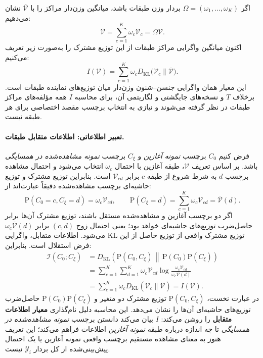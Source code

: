 اگر $\Omega=(\omega_1,\ldots,\omega_K)$ بردار وزن طبقات باشد، میانگین وزن‌دار مراکز را با $\overline{\mathcal V}$ نشان می‌دهیم:
\begin{equation}\label{cmp:eq:ch3-global-center}
\overline{\mathcal V}
=\sum_{c=1}^{K}\omega_c\mathcal V_c
=\Omega\mathcal V.
\end{equation}
اکنون میانگین واگرایی مراکز طبقات از این توزیع مشترک را به‌صورت زیر تعریف می‌کنیم:
\begin{equation}\label{cmp:eq:ch3-I-on-V}
\boxed{I(\mathcal V)=
\sum_{c=1}^{K}\omega_c
D_{\mathrm{KL}}\bigl(\mathcal V_c\|\overline{\mathcal V}\bigr).}
\end{equation}
این معیار همان واگرایی جنسن--شنون وزن‌دار میان توزیع‌های نماینده طبقات است. برخلاف $T$ و نسخه‌های جایگشتی و لگاریتمی آن، برای محاسبه $I$ همه مؤلفه‌های مراکز طبقات در نظر گرفته می‌شوند و نیازی به انتخاب برچسب مقصد اختصاصی برای هر طبقه نیست.

\paragraph{تعبیر اطلاعاتی: اطلاعات متقابل طبقات.}
فرض کنیم $C_0$ برچسب \emph{نمونه آغازین} و $C_\xi$ برچسب \emph{نمونه مشاهده‌شده در همسایگی} باشد. بر اساس تعریف $\mathcal V$، طبقه آغازین با احتمال $\omega_c$ انتخاب می‌شود و احتمال مشاهده برچسب $d$ به شرط شروع از طبقه $c$ برابر $\mathcal V_{cd}$ است. بنابراین توزیع مشترک و توزیع حاشیه‌ای برچسب مشاهده‌شده دقیقاً عبارت‌اند از:
\begin{equation}\label{cmp:eq:ch3-I-joint-distribution}
\mathrm P(C_0=c,C_\xi=d)=\omega_c\mathcal V_{cd},
\qquad
\mathrm P(C_\xi=d)=\sum_{c=1}^{K}\omega_c\mathcal V_{cd}
=\overline{\mathcal V}(d).
\end{equation}
اگر دو برچسب آغازین و مشاهده‌شده مستقل باشند، توزیع مشترک آن‌ها برابر حاصل‌ضرب توزیع‌های حاشیه‌ای خواهد بود؛ یعنی احتمال زوج $(c,d)$ برابر $\omega_c\overline{\mathcal V}(d)$ می‌شود. اطلاعات متقابل، واگرایی KL توزیع مشترک واقعی از توزیع حاصل از این فرض استقلال است. بنابراین:
\begin{equation}\label{cmp:eq:ch3-I-mutual-info}
\begin{aligned}
\mathcal I(C_0;C_\xi)
&=D_{\mathrm{KL}}\!\left(
\mathrm P(C_0,C_\xi)
\,\middle\|\,
\mathrm P(C_0)\mathrm P(C_\xi)\right)\\
&=\sum_{c=1}^{K}\sum_{d=1}^{K}
\omega_c\mathcal V_{cd}
\log\frac{\omega_c\mathcal V_{cd}}
{\omega_c\overline{\mathcal V}(d)}\\
&=\sum_{c=1}^{K}\omega_c
D_{\mathrm{KL}}(\mathcal V_c\|\overline{\mathcal V})
=\boxed{I(\mathcal V)}.
\end{aligned}
\end{equation}
در عبارت نخست، $\mathrm P(C_0,C_\xi)$ توزیع مشترک دو متغیر و $\mathrm P(C_0)\mathrm P(C_\xi)$ حاصل‌ضرب توزیع‌های حاشیه‌ای آن‌ها را نشان می‌دهد.
این محاسبه دلیل نام‌گذاری \textbf{معیار اطلاعات متقابل} را روشن می‌کند: $I$ بیان می‌کند دانستن برچسب \emph{نمونه مشاهده‌شده در همسایگی} تا چه اندازه درباره طبقه \emph{نمونه آغازین} اطلاعات فراهم می‌کند؛ این تعریف هنوز به معنای مشاهده مستقیم برچسب واقعی نمونه آغازین یا یک احتمال پیش‌بینی‌شده از کل بردار $\mathscr Y_i$ نیست.

